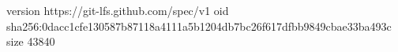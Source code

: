 version https://git-lfs.github.com/spec/v1
oid sha256:0dacc1cfe130587b87118a4111a5b1204db7bc26f617dfbb9849cbae33ba493c
size 43840
